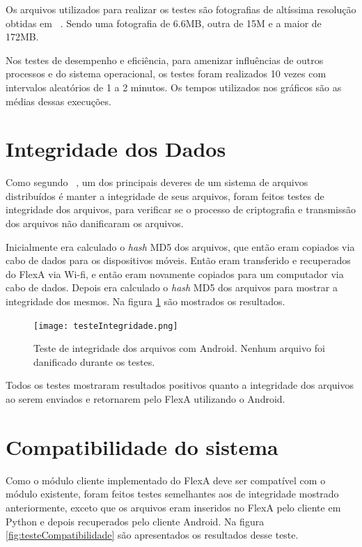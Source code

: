      Os arquivos utilizados para realizar os testes são fotografias de altíssima resolução obtidas em  ~\cite{hubble}. Sendo uma fotografia de 6.6MB, outra de 15M e a maior de 172MB.
     
     
     Nos testes de desempenho e eficiência, para amenizar influências de outros processos e do sistema operacional, os testes foram realizados 10 vezes com intervalos aleatórios de 1 a 2 minutos. Os tempos utilizados nos gráficos são as médias dessas execuções.

\section{Integridade dos Dados}

Como segundo ~\cite{coulouris}, um dos principais deveres de um sistema de arquivos distribuídos é manter a integridade de seus arquivos, foram feitos testes de integridade dos arquivos, para verificar se o processo de criptografia e transmissão dos arquivos não danificaram os arquivos. 
    
    Inicialmente era calculado o \textit{hash} MD5 dos arquivos, que então eram copiados via cabo de dados para os dispositivos móveis. Então eram transferido e recuperados do FlexA via Wi-fi, e então eram novamente copiados para um computador via cabo de dados. Depois era calculado o \textit{hash} MD5 dos arquivos para mostrar a integridade dos mesmos. Na figura \ref{fig:testesIntegridade} são mostrados os resultados.

    \begin{figure}[!ht]
    \centering
    \texttt{[image: testeIntegridade.png]}
    \caption{Teste de integridade dos arquivos com Android. Nenhum arquivo foi danificado durante os testes.}
    \label{fig:testesIntegridade}
    \end{figure}

    Todos os testes mostraram resultados positivos quanto a integridade dos arquivos ao serem enviados e retornarem pelo FlexA utilizando o Android.
    
\section{Compatibilidade do sistema}

    Como o módulo cliente implementado do FlexA deve ser compatível com o módulo existente, foram feitos testes semelhantes aos de integridade mostrado anteriormente, exceto que os arquivos eram inseridos no FlexA pelo cliente em Python e depois recuperados pelo cliente Android. Na figura \ref{fig:testeCompatibilidade} são apresentados os resultados desse teste.
    
